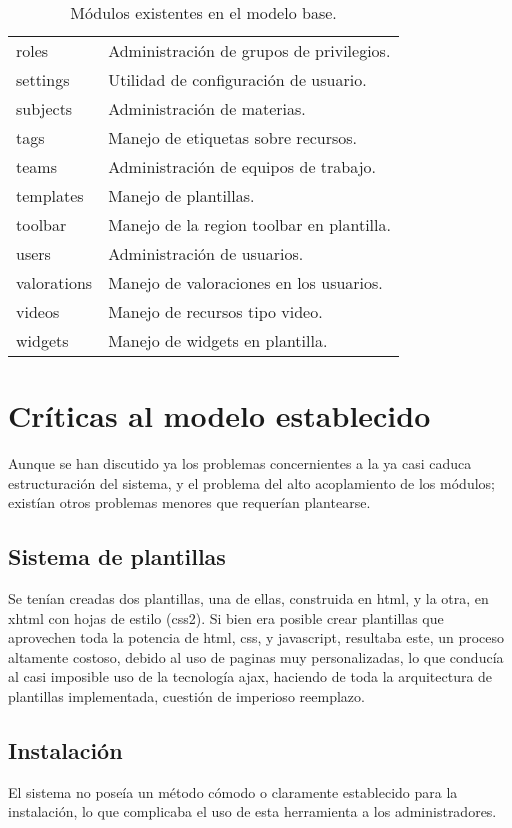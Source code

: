 \begin{table}
\begin{tabular}{l|l}
roles & Administración de grupos de privilegios. \\
settings & Utilidad de configuración de usuario. \\
subjects & Administración de materias. \\
tags & Manejo de etiquetas sobre recursos. \\
teams & Administración de equipos de trabajo. \\
templates & Manejo de plantillas. \\
toolbar & Manejo de la region toolbar en plantilla. \\
users & Administración de usuarios. \\
valorations & Manejo de valoraciones en los usuarios. \\
videos & Manejo de recursos tipo video. \\
widgets & Manejo de widgets en plantilla. \\
\end{tabular}
\caption{Módulos existentes en el modelo base.}
\label{modulos_base}
\end{table}

\section{Críticas al modelo establecido}
Aunque se han discutido ya los problemas concernientes a la ya casi caduca estructuración del sistema, y el problema del
alto acoplamiento de los módulos; existían otros problemas menores que requerían plantearse.

\subsection{Sistema de plantillas}
Se tenían creadas dos plantillas, una de ellas, construida en html, y la otra, en xhtml con hojas de estilo (css2). Si
bien era posible crear plantillas que aprovechen toda la potencia de html, css, y javascript, resultaba este, un proceso
altamente costoso, debido al uso de paginas muy personalizadas, lo que conducía al casi imposible uso de la tecnología
ajax, haciendo de toda la arquitectura de plantillas implementada, cuestión de imperioso reemplazo.

\subsection{Instalación}
El sistema no poseía un método cómodo o claramente establecido para la instalación, lo que complicaba el uso de esta
herramienta a los administradores.

